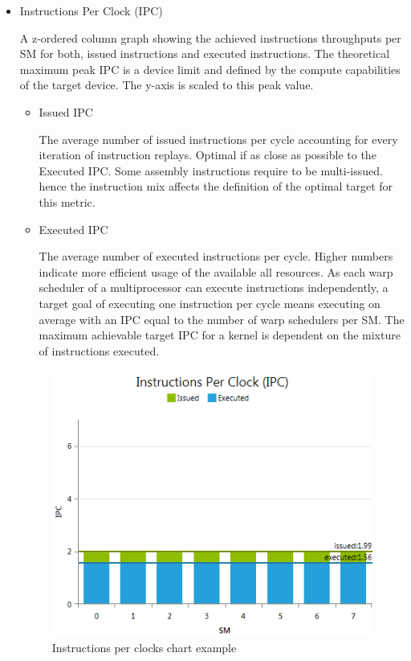 \documentclass[oneside,openright,12pt,final,en]{mgr}
\begin{document}
\begin{itemize}	
	\item Instructions Per Clock (IPC)
	
	A z-ordered column graph showing the achieved instructions throughputs per SM for both, issued instructions and executed instructions. The theoretical maximum peak IPC is a device limit and defined by the compute capabilities of the target device. The y-axis is scaled to this peak value.
	\begin{itemize}	
		\item Issued IPC
		
		The average number of issued instructions per cycle accounting for every iteration of instruction replays. Optimal if as close as possible to the Executed IPC. Some assembly instructions require to be multi-issued. hence the instruction mix affects the definition of the optimal target for this metric.
	
		\item Executed IPC
		
		The average number of executed instructions per cycle. Higher numbers indicate more efficient usage of the available all resources. As each warp scheduler of a multiprocessor can execute instructions independently, a target goal of executing one instruction per cycle means executing on average with an IPC equal to the number of warp schedulers per SM. The maximum achievable target IPC for a kernel is dependent on the mixture of instructions executed.		
		
	\end{itemize}

	\begin{figure}[h!]
		\centering
		\includegraphics{InstructionStatisticsChartInstructionsPerClock}
		\caption{Instructions per clocks chart example}
	\end{figure}


\end{itemize}
\end{document}
